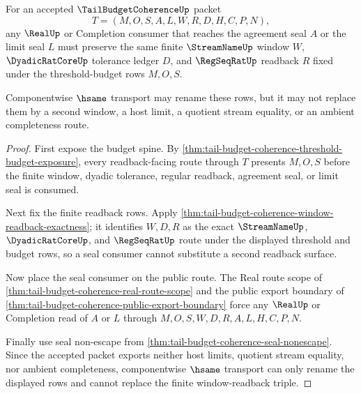 \begin{theorem}
\label{thm:tail-budget-coherence-real-seal-window-stability}
For an accepted $\TailBudgetCoherenceUp$ packet
$$
T=(M,O,S,A,L,W,R,D,H,C,P,N),
$$
any $\RealUp$ or Completion consumer that reaches the agreement seal $A$ or the limit seal $L$ must preserve the same finite $\StreamNameUp$ window $W$, $\DyadicRatCoreUp$ tolerance ledger $D$, and $\RegSeqRatUp$ readback $R$ fixed under the threshold-budget rows $M,O,S$.

Componentwise $\hsame$ transport may rename these rows, but it may not replace them by a second window, a host limit, a quotient stream equality, or an ambient completeness route.
\end{theorem}
\begin{proof}
First expose the budget spine. By \autoref{thm:tail-budget-coherence-threshold-budget-exposure}, every readback-facing route through $T$ presents $M,O,S$ before the finite window, dyadic tolerance, regular readback, agreement seal, or limit seal is consumed.

Next fix the finite readback rows. Apply \autoref{thm:tail-budget-coherence-window-readback-exactness}; it identifies $W,D,R$ as the exact $\StreamNameUp$, $\DyadicRatCoreUp$, and $\RegSeqRatUp$ route under the displayed threshold and budget rows, so a seal consumer cannot substitute a second readback surface.

Now place the seal consumer on the public route. The Real route scope of \autoref{thm:tail-budget-coherence-real-route-scope} and the public export boundary of \autoref{thm:tail-budget-coherence-public-export-boundary} force any $\RealUp$ or Completion read of $A$ or $L$ through $M,O,S,W,D,R,A,L,H,C,P,N$.

Finally use seal non-escape from \autoref{thm:tail-budget-coherence-seal-nonescape}. Since the accepted packet exports neither host limits, quotient stream equality, nor ambient completeness, componentwise $\hsame$ transport can only rename the displayed rows and cannot replace the finite window-readback triple.
\end{proof}


